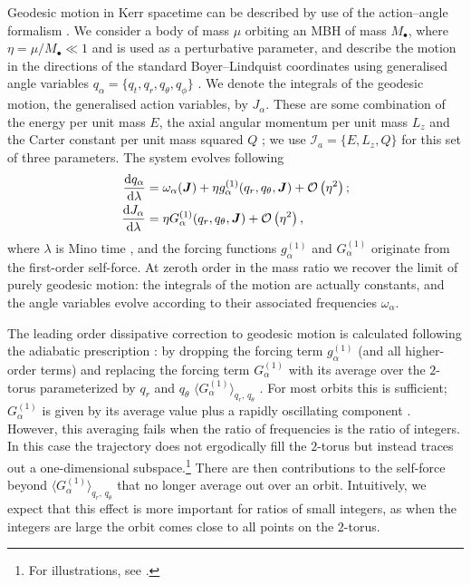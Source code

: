 Geodesic motion in Kerr spacetime can be described by use of the action--angle formalism \citep[chapter 10]{Goldstein2002}. We consider a body of mass $\mu$ orbiting an MBH of mass $M_\bullet$, where $\eta = \mu/M_\bullet \ll 1$ and is used as a perturbative parameter, and describe the motion in the directions of the standard Boyer--Lindquist coordinates using generalised angle variables $q_\alpha = \{q_t,q_r,q_\theta,q_\phi\}$ \citep{Hinderer2008}. We denote the integrals of the geodesic motion, the generalised action variables, by $J_\alpha$. These are some combination of the energy per unit mass $E$, the axial angular momentum per unit mass $L_z$ and the Carter constant per unit mass squared $Q$ \citep{Carter1968}; we use $\mathcal{I}_a = \{E,L_z,Q\}$ for this set of three parameters. The system evolves following \citep{Flanagan2012}
\begin{subequations}\label{eq:Mino-E-o-M}
\begin{align}
\dfrac{\mathrm{d} {q_\alpha}}{\mathrm{d} {\lambda}} = {} & \omega_\alpha(\boldsymbol{J}) + \eta g_\alpha^{(1)}(q_r,q_\theta,\boldsymbol{J}) + \mathcal{O}\left({\eta^2}\right); \\
\dfrac{\mathrm{d} {J_\alpha}}{\mathrm{d} {\lambda}} = {} & \eta G_\alpha^{(1)}(q_r,q_\theta,\boldsymbol{J}) + \mathcal{O}\left({\eta^2}\right),
\end{align}
\end{subequations}
where $\lambda$ is Mino time \citep{Mino2003}, and the forcing functions $g_\alpha^{(1)}$ and $G_\alpha^{(1)}$ originate from the first-order self-force. At zeroth order in the mass ratio we recover the limit of purely geodesic motion: the integrals of the motion are actually constants, and the angle variables evolve according to their associated frequencies $\omega_\alpha$.

The leading order dissipative correction to geodesic motion is calculated following the adiabatic prescription \citep{Hinderer2008}: by dropping the forcing term $g_\alpha^{(1)}$ (and all higher-order terms) and replacing the forcing term $G_\alpha^{(1)}$ with its average over the $2$-torus parameterized by $q_r$ and $q_\theta$ $\langle G_\alpha^{(1)}\rangle_{q_r,\,q_\theta}$ \citep{Drasco2005}. For most orbits this is sufficient; $G_\alpha^{(1)}$ is given by its average value plus a rapidly oscillating component \citep[chapter 5, section 1]{Arnold1988}. However, this averaging fails when the ratio of frequencies is the ratio of integers. In this case the trajectory does not ergodically fill the $2$-torus but instead traces out a one-dimensional subspace.\footnote{For illustrations, see \citet{Grossman2012}.} There are then contributions to the self-force beyond $\langle G_\alpha^{(1)}\rangle_{q_r,\,q_\theta}$ that no longer average out over an orbit. Intuitively, we expect that this effect is more important for ratios of small integers, as when the integers are large the orbit comes close to all points on the $2$-torus.

